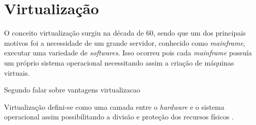 \chapter{Virtualização}
O conceito virtualização surgiu na década de 60, sendo que um dos principais motivos foi a necessidade de um grande servidor,
conhecido como \textit{mainframe}, executar uma variedade de \textit{softwares}. Isso ocorreu pois cada \textit{mainframe} possuía
um próprio sistema operacional necessitando assim a criação de máquinas virtuais.

Segundo \cite{carissimi2008}  falar sobre vantagens virtualizacao

Virtualização defini-se como uma camada entre o \textit{hardware} e o sistema operacional assim possibilitando a divisão e proteção
dos recursos físicos \cite{smithenair2005}. 

%

